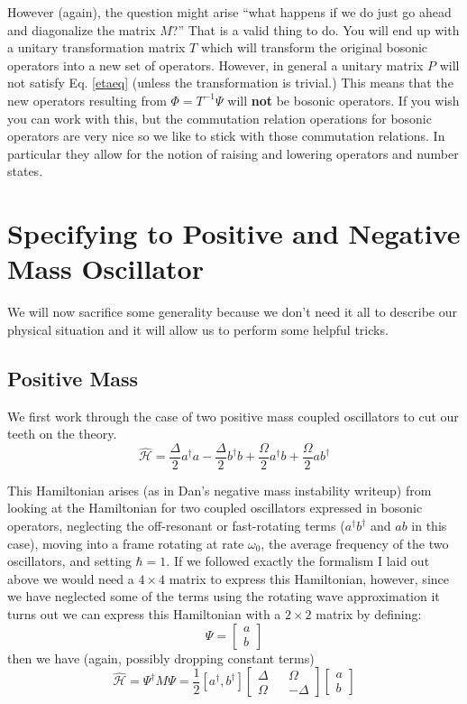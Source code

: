 \documentclass[12pt]{article}
\begin{document}
However (again), the question might arise ``what happens if we do just go ahead and diagonalize the matrix $M$?'' That is a valid thing to do. You will end up with a unitary transformation matrix $T$ which will transform the original bosonic operators into a new set of operators. However, in general a unitary matrix $P$ will not satisfy Eq. \ref{etaeq} (unless the transformation is trivial.) This means that the new operators resulting from $\Phi = T^{-1}\Psi$ will \textbf{not} be bosonic operators. If you wish you can work with this, but the commutation relation operations for bosonic operators are very nice so we like to stick with those commutation relations. In particular they allow for the notion of raising and lowering operators and number states.


\section{Specifying to Positive and Negative Mass Oscillator}
We will now sacrifice some generality because we don't need it all to describe our physical situation and it will allow us to perform some helpful tricks. 
\subsection{Positive Mass}
We first work through the case of two positive mass coupled oscillators to cut our teeth on the theory.
\begin{equation}\hat{\mathcal{H}} = \frac{\Delta}{2} a^{\dagger}a - \frac{\Delta}{2} b^{\dagger}b + \frac{\Omega}{2}a^{\dagger}b + \frac{\Omega}{2} a b^{\dagger}\end{equation}

This Hamiltonian arises (as in Dan's negative mass instability writeup) from looking at the Hamiltonian for two coupled oscillators expressed in bosonic operators, neglecting the off-resonant or fast-rotating terms ($a^{\dagger}b^{\dagger}$ and $ab$ in this case), moving into a frame rotating at rate $\omega_0$, the average frequency of the two oscillators, and setting $\hbar =1$.
If we followed exactly the formalism I laid out above we would need a $4\times4$ matrix to express this Hamiltonian, however, since we have neglected some of the terms using the rotating wave approximation it turns out we can express this Hamiltonian with a $2\times2$ matrix by defining:
\begin{equation}
\Psi = 
\begin{bmatrix}
a\\b
\end{bmatrix}
\end{equation}
then we have (again, possibly dropping constant terms)
\begin{equation}
\hat{\mathcal{H}} = \Psi^{\dagger} M \Psi = \frac{1}{2}[a^{\dagger}, b^{\dagger}] 
\begin{bmatrix}
\Delta && \Omega\\
\Omega && -\Delta
\end{bmatrix}
\begin{bmatrix}
a\\b
\end{bmatrix}
\end{equation}
\end{document}
